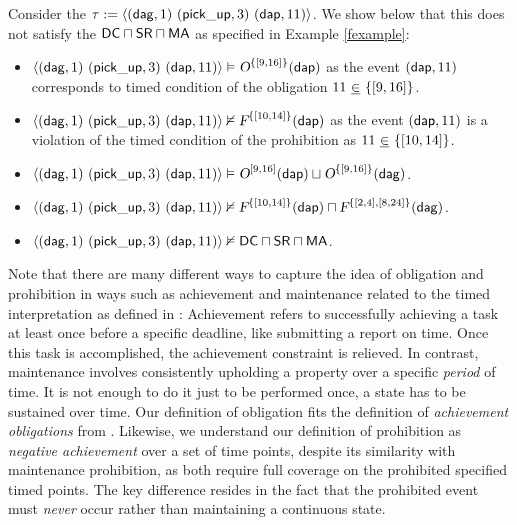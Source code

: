 \begin{example}\label{example10}
 Consider the \timedword  $\tau:= \trace{ (\delAtGate,1) \ (\pickU,3) \ (\delAtPark,11)  }$. 
 We show below that this \timedword does not satisfy the $\mathsf{DC} \sqcap \mathsf{SR} \sqcap \mathsf{MA}$ as specified in Example \ref{fexample}:
 \begin{itemize}
				\item $\trace{(\delAtGate,1) \ (\pickU,3) \ (\delAtPark,11) } \dutysat \ob{\{[9,16]\}}{\delAtPark} $ as the event $(\mathsf{dap},11)$ corresponds to timed condition of the obligation $11 ~\underline{\in}~ \{[9,16]\}$.
				\item $\trace{(\delAtGate,1) \ (\pickU,3) \ (\delAtPark,11) } \nvDash \forb{\{[10,14]\}}{\delAtPark} $ as the event $(\mathsf{dap},11)$ is a violation of the timed condition of the prohibition as $11 ~\underline{\in}~ \{[10,14]\}$.
				\item $\trace{(\delAtGate,1) \ (\pickU,3) \ (\delAtPark,11) } \dutysat \ob{[9,16]}{\delAtPark} \sqcup \ob{\{[9,16]\}}{\delAtGate}$.
 				\item $\trace{(\delAtGate,1) \ (\pickU,3) \ (\delAtPark,11) } \nvDash \forb{\{[10,14]\}}{\delAtPark} \sqcap \forb{\{[2,4],[8,24]\}}{\delAtGate} $.
                \item $\trace{(\delAtGate,1) \ (\pickU,3) \ (\delAtPark,11) } \nvDash \DC \sqcap \SR \sqcap \MA$.
\end{itemize}
\end{example}
\begin{remark}
 Note that there are many different ways to capture the idea of obligation and prohibition in ways such as achievement and maintenance related to the timed interpretation as defined in \cite{DBLP:conf/deon/BroersenDDM04,governatori2011justice}: Achievement refers to successfully achieving a task at least once before a specific deadline, like submitting a report on time. Once this task is accomplished, the achievement constraint is relieved. In contrast, maintenance involves consistently upholding a property over a specific \emph{period} of time. It is not enough to do it just to be performed once, a state has to be sustained over time.
 Our definition of obligation fits the definition of \emph{achievement obligations} from \cite{DBLP:conf/hicss/DignumK98}. 
Likewise, we understand our definition of prohibition as \emph{negative achievement} over a set of time points, despite its similarity with maintenance prohibition, as both require full coverage on the prohibited specified timed points. The key difference resides in the fact that the prohibited event must \emph{never} occur rather than maintaining a continuous state.
\end{remark}

